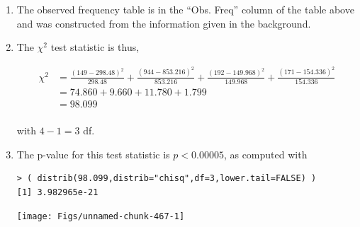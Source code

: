\documentclass[10pt,openany]{book}\usepackage[]{graphicx}\usepackage[]{color}
\makeatletter
\newenvironment{kframe}{%
 \def\at@end@of@kframe{}%
 \ifinner\ifhmode%
  \def\at@end@of@kframe{\end{minipage}}%
  \begin{minipage}{\columnwidth}%
 \fi\fi%
 \def\FrameCommand##1{\hskip\@totalleftmargin \hskip-\fboxsep
 \colorbox{shadecolor}{##1}\hskip-\fboxsep
     \hskip-\linewidth \hskip-\@totalleftmargin \hskip\columnwidth}%
 \MakeFramed {\advance\hsize-\width
   \@totalleftmargin\z@ \linewidth\hsize
   \@setminipage}}%
 {\par\unskip\endMakeFramed%
 \at@end@of@kframe}
\newenvironment{knitrout}{}{} %
\makeatother
\begin{document}
\begin{itemize}
\begin{enumerate}
\begin{center}
\begin{tabular}{ccc}
            \hline\hline
          \end{tabular}
        \end{center}
      \item The observed frequency table is in the ``Obs. Freq'' column of the table above and was constructed from the information given in the background.
      \item The $\chi^{2}$ test statistic is thus,
        \begin{center}
          \[  \begin{split}
            \chi^{2} &= \frac{(149-298.48)^{2}}{298.48} + \frac{(944-853.216)^{2}}{853.216} + \frac{(192-149.968)^{2}}{149.968} + \frac{(171-154.336)^{2}}{154.336} \\
            &= 74.860 + 9.660 + 11.780 + 1.799 \\
            & = 98.099 \\
          \end{split}  \]
        \end{center}
        with $4-1=3$ df.
      \item The p-value for this test statistic is $p<0.00005$, as computed with
\begin{knitrout}
\color{fgcolor}\begin{kframe}
\begin{verbatim}
> ( distrib(98.099,distrib="chisq",df=3,lower.tail=FALSE) )
[1] 3.982965e-21
\end{verbatim}
\end{kframe}

{\centering \texttt{[image: Figs/unnamed-chunk-467-1]} 

}




\end{knitrout}
\end{enumerate}
\end{itemize}
\end{document}
